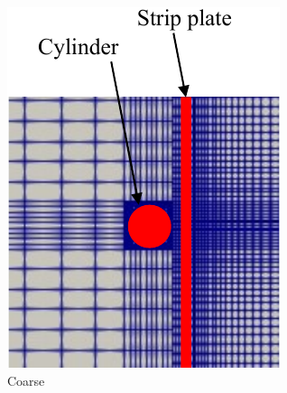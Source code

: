 \documentclass[oneside]{utmthesis}
\begin{document}
\begin{figure}[!h]
  \centering
  \begin{subfigure}[h]{0.3\textwidth}
    \includegraphics[width=\textwidth]{figs/threeGridsCoarse}
    \caption{Coarse}
    \label{fig:coarseMesh}
  \end{subfigure} \hspace{0.25cm}
  \begin{subfigure}[h]{0.3\textwidth}

\end{subfigure}
\end{figure}
\end{document}
